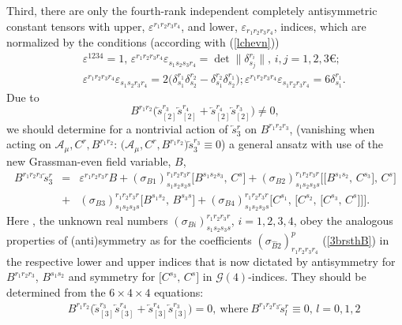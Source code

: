\documentclass[10pt]{article}
\begin{document}
Third,  there are only the fourth-rank independent completely antisymmetric
constant tensors with upper, $\varepsilon^{r_1r_2r_3r_4}$,
and lower, $\varepsilon_{r_1r_2r_3r_4}$, indices, which are normalized
by the conditions (according with (\ref{lchevn}))
\begin{eqnarray}\label{eprts}
  && \varepsilon^{1234}= 1, \, \varepsilon^{r_1r_2r_3r_4}\varepsilon_{s_1s_2s_3r_4}=  \det \|\delta^{r_i}_{s_j}\|, \, i,j=1,2,3€; \\
  && \varepsilon^{r_1r_2r_3r_4}\varepsilon_{s_1s_2r_3r_4}=2\big(\delta^{r_1}_{s_1}\delta_{s_2}^{r_2} -\delta^{r_2}_{s_1}\delta_{s_2}^{r_1} \big) ;  \varepsilon^{r_1r_2r_3r_4}\varepsilon_{s_1r_2r_3r_4}= 6\delta^{r_1}_{s_1}. \nonumber
\end{eqnarray}
 Due to
\begin{equation}\label{consistB4a}
B^{r_1r_2}\big(\overleftarrow{s}{}^{r_3}_{[2]}\overleftarrow{s}{}^{r_4}_{[2]}
+\overleftarrow{s}{}^{r_4}_{[2]}\overleftarrow{s}{}^{r_3}_{[2]}\big) \ne 0,
\end{equation}
we should determine for a nontrivial action of $\overleftarrow{s}{}^{r}_3$ on ${B}^{r_1r_2r_3}$, (vanishing when acting on $\mathcal{A}_\mu, C^r, B^{r_1r_2}$: $\big(\mathcal{A}_\mu,C^r, B^{r_1r_2}\big)\overleftarrow{s}{}^{r_3}_{3} \equiv 0$)
 a general ansatz with use of the new Grassman-even field variable, $B$,
\begin{eqnarray}
B^{r_1r_2r_3} \overleftarrow{s}{}^r_3 & = & \varepsilon^{r_1r_2r_3r}B+ (\sigma_{{B}1})_{s_1s_2s_3s}^{r_1r_2r_3r}  \big[B^{s_1s_2s_3},\,C^s\big]+ (\sigma_{{B}2})_{s_1s_2s_3s}^{r_1r_2r_3r}  \big[\big[B^{s_1s_2},\,C^{s_3}\big],\,C^{s}\big] \nonumber \\
&+& (\sigma_{{B}3})^{r_1r_2r_3r}_{s_1s_2s_3s}  \big[B^{s_1s_2},\,B^{s_3s}\big] +(\sigma_{{B}4})^{r_1r_2r_3r}_{s_1s_2s_3s}  \big[C^{s_1},\,\big[C^{s_2},\,\big[C^{s_3},\,C^{s}\big]\big]\big]. \label{4brsthB}
\end{eqnarray}
Here ,  the unknown real numbers $(\sigma_{{B}i})^{r_1r_2r_3r}_{s_1s_2s_3s}$, $i=1,2,3,4$,  obey the analogous properties of (anti)sym\-met\-ry as for the coefficients $(\sigma_{\widehat{B}2})^{p}_{r_1r_2r_3r_4}$ (\ref{3brsthB}) in the respective lower and upper indices that is now dictated  by antisymmetry for $B^{r_1r_2r_3}$, $B^{s_1s_2}$ and symmetry for  $\big[C^{s_3},\,C^{s}\big] $ in $\mathcal{G}(4)$-indices.
They should be determined from the $6\times 4\times 4$ equations:
\begin{eqnarray}\label{consistB4}
&&  B^{r_1r_2}\big(\overleftarrow{s}{}^{r_3}_{[3]}\overleftarrow{s}{}^{r_4}_{[3]}+\overleftarrow{s}{}^{r_4}_{[3]}\overleftarrow{s}{}^{r_3}_{[3]}\big) =0, \ \mathrm{where} \ B^{r_1r_2r_3} \overleftarrow{s}{}^{r}_{l}\equiv 0,\,  l=0,1,2 \end{eqnarray}
\end{document}
